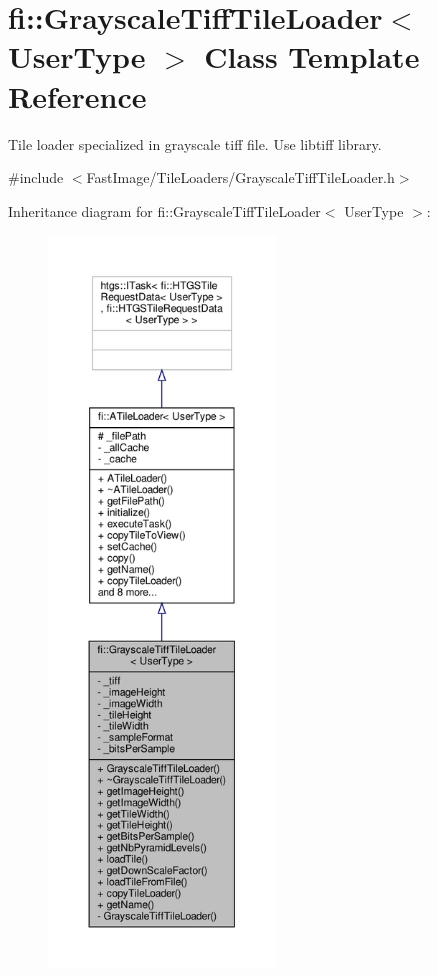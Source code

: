 \hypertarget{classfi_1_1GrayscaleTiffTileLoader}{}\section{fi\+:\+:Grayscale\+Tiff\+Tile\+Loader$<$ User\+Type $>$ Class Template Reference}
\label{classfi_1_1GrayscaleTiffTileLoader}


Tile loader specialized in grayscale tiff file. Use libtiff library.  




{\ttfamily \#include $<$Fast\+Image/\+Tile\+Loaders/\+Grayscale\+Tiff\+Tile\+Loader.\+h$>$}



Inheritance diagram for fi\+:\+:Grayscale\+Tiff\+Tile\+Loader$<$ User\+Type $>$\+:
\nopagebreak
\begin{figure}[H]
\begin{center}
\leavevmode
\includegraphics[height=550pt]{d4/d69/classfi_1_1GrayscaleTiffTileLoader__inherit__graph}
\end{center}
\end{figure}


